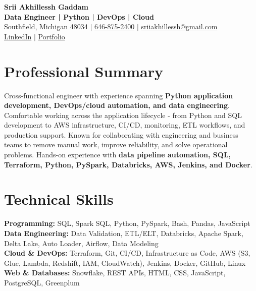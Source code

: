 \documentclass[letterpaper,10pt]{article}
\begin{document}
\fontsize{9.35pt}{10.45pt}\selectfont

\begin{center}
    {\LARGE \textbf{Srii Akhillessh Gaddam}} \\[-1pt]
    \textbf{Data Engineer | Python | DevOps | Cloud} \\[2pt]
    Southfield, Michigan 48034 $|$
    \href{tel:6468752400}{646-875-2400} $|$
    \href{mailto:sriiakhillessh@gmail.com}{sriiakhillessh@gmail.com} \\[1pt]
    \href{https://www.linkedin.com/in/srii-akhiilessh-gaddam-b48668191/}{LinkedIn} $|$
    \href{https://sriiakhillesshg.github.io/portfolio/}{Portfolio}
\end{center}
\vspace{-8pt}

\section{Professional Summary}
\small{Cross-functional engineer with experience spanning \textbf{Python application development, DevOps/cloud automation, and data engineering}. Comfortable working across the application lifecycle - from Python and SQL development to AWS infrastructure, CI/CD, monitoring, ETL workflows, and production support. Known for collaborating with engineering and business teams to remove manual work, improve reliability, and solve operational problems. Hands-on experience with \textbf{data pipeline automation, SQL, Terraform, Python, PySpark, Databricks, AWS, Jenkins, and Docker}.}

\section{Technical Skills}
\small{
\textbf{Programming:} SQL, Spark SQL, Python, PySpark, Bash, Pandas, JavaScript \\
\textbf{Data Engineering:} Data Validation, ETL/ELT, Databricks, Apache Spark, Delta Lake, Auto Loader, Airflow, Data Modeling \\
\textbf{Cloud \& DevOps:} Terraform, Git, CI/CD, Infrastructure as Code, AWS (S3, Glue, Lambda, Redshift, IAM, CloudWatch), Jenkins, Docker, GitHub, Linux \\
\textbf{Web \& Databases:} Snowflake, REST APIs, HTML, CSS, JavaScript, PostgreSQL, Greenplum
}
\end{document}
